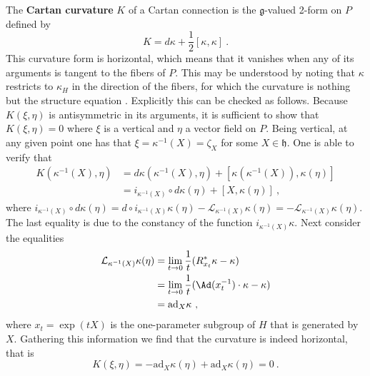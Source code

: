 \documentclass[11pt]{article}
\begin{document}
The \textbf{Cartan curvature} $K$ of a Cartan connection is the 
$\mathfrak{g}$-valued 2-form on $P$ defined by
\begin{equation}\label{eq:cartan-curvature}
	K = d\kappa + \frac{1}{2}[\kappa,\kappa]~.
\end{equation}
This curvature form is horizontal, which means that it vanishes 
when any of its arguments is tangent to the fibers of $P$. This 
may be understood by noting that $\kappa$ restricts to $\kappa_H$ 
in the direction of the fibers, for which the curvature is 
nothing but the structure equation \cite{kob1996found}.  
Explicitly this can be checked as follows.  Because $K(\xi,\eta)$ 
is antisymmetric in its arguments, it is sufficient to show that 
$K(\xi,\eta) = 0$ where $\xi$ is a vertical and $\eta$ a vector 
field on $P$. Being vertical, at any given point one has that 
$\xi = \kappa^{-1}(X) = \zeta_X$ for some $X \in \mathfrak{h}$.  
One is able to verify that 
%
\begin{displaymath}
	\begin{split}
		K(\kappa^{-1}(X),\eta) &= 
		d\kappa(\kappa^{-1}(X),\eta) + 
		[\kappa(\kappa^{-1}(X)),\kappa(\eta)] 
		\\
		&= i_{\kappa^{-1}(X)} \circ d\kappa(\eta) + 
		[X,\kappa(\eta)]~,
	\end{split}
\end{displaymath}
where $i_{\kappa^{-1}(X)} \circ d\kappa(\eta) = d 
\circ i_{\kappa^{-1}(X)}\kappa(\eta) - 
\mathcal{L}_{\kappa^{-1}(X)}\kappa(\eta) = 
-\mathcal{L}_{\kappa^{-1}(X)}\kappa(\eta)$. The 
last equality is due to the constancy of the function 
$i_{\kappa^{-1}(X)}\kappa$. Next consider the equalities
%
\begin{displaymath}
	\begin{split}
		\mathcal{L}_{\kappa^{-1}(X)}\kappa(\eta)
		&= \lim_{t \to 0} \frac{1}{t} (R^\ast_{x_t}\kappa - \kappa) 
		\\
		&= \lim_{t \to 0} \frac{1}{t} (\Ad(x^{-1}_t) \cdot \kappa - 
		\kappa) \\
		&=	\mathrm{ad}_X \kappa~,
	\end{split}
\end{displaymath}
where $x_t = \exp(tX)$ is the one-parameter subgroup of $H$ that 
is generated by $X$.  Gathering this information we find that the 
curvature is indeed horizontal, that is
%
\begin{displaymath}
	K(\xi,\eta) = -\mathrm{ad}_X \kappa(\eta) 
	+ \mathrm{ad}_X \kappa(\eta) = 0~.
\end{displaymath}
\end{document}
